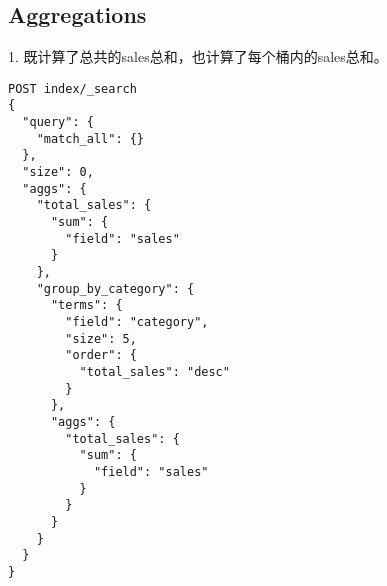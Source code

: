 \documentclass[]{exam}
\begin{document}
\begin{questions}
\section{Aggregations}
1. 既计算了总共的sales总和，也计算了每个桶内的sales总和。
\begin{verbatim}
POST index/_search
{
  "query": {
    "match_all": {}
  },
  "size": 0,
  "aggs": {
    "total_sales": {
      "sum": {
        "field": "sales"
      }
    },
    "group_by_category": {
      "terms": {
        "field": "category",
        "size": 5,
        "order": {
          "total_sales": "desc"
        }
      },
      "aggs": {
        "total_sales": {
          "sum": {
            "field": "sales"
          }
        }
      }
    }
  }
}
\end{verbatim}















\end{questions}
\end{document}
